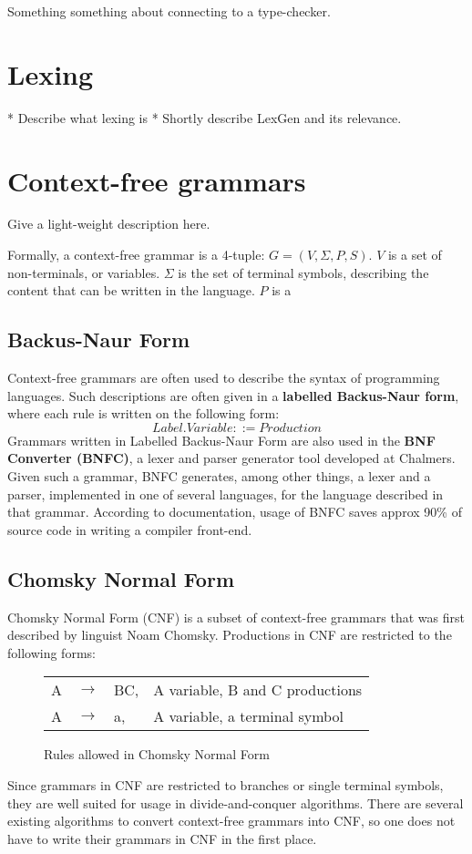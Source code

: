 \documentclass[a4paper,12pt,twosided]{report}
\begin{document}
Something something about connecting to a type-checker.

\section{Lexing}
* Describe what lexing is
* Shortly describe LexGen and its relevance.

\section{Context-free grammars}
Give a light-weight description here.

Formally, a context-free grammar is a 4-tuple: $G = (V, \Sigma, P, S)$. $V$ is
a set of non-terminals, or variables. $\Sigma$ is the set of terminal symbols,
describing the content that can be written in the language. $P$ is a 

\subsection{Backus-Naur Form}
Context-free grammars are often used to describe the syntax of programming
languages. Such descriptions are often given in a \textbf{labelled Backus-Naur
form}, where each rule is written on the following form:
$$Label. Variable ::= Production$$ %
Grammars written in Labelled Backus-Naur Form are also used in the \textbf{BNF
Converter (BNFC)}, a lexer and parser generator tool developed at Chalmers.
Given such a grammar, BNFC generates, among other things, a lexer and a parser,
implemented in one of several languages, for the language described in that
grammar. According to documentation, usage of BNFC saves approx 90\% of
source code in writing a compiler front-end. 

\subsection{Chomsky Normal Form}
Chomsky Normal Form (CNF) is a subset of context-free grammars that was first
described by linguist Noam Chomsky. Productions in CNF are restricted to the
following forms:

\begin{figure}[h]
\begin{tabular}{l l l l}
    A & $\rightarrow$ & BC, & A variable, B and C productions \\
    A & $\rightarrow$ & a, & A variable, a terminal symbol \\
\end{tabular}
\caption{Rules allowed in Chomsky Normal Form}
\end{figure}
Since grammars in CNF are restricted to branches or single terminal symbols,
they are well suited for usage in divide-and-conquer algorithms. There are
several existing algorithms to convert context-free grammars into CNF, so one
does not have to write their grammars in CNF in the first place.
\end{document}
